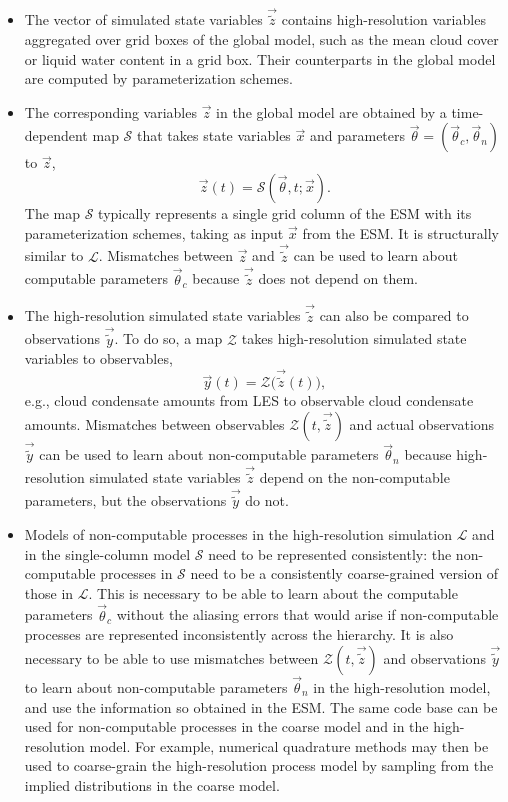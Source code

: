 \documentclass{article}
\begin{document}
\begin{itemize}
    \item The vector of simulated state variables $\vec{\tilde z}$ contains high-resolution variables aggregated over grid boxes of the global model,  such as the mean cloud cover or liquid water content in a grid box. Their counterparts in the global model are computed by parameterization schemes.
    \item The corresponding variables $\vec{z}$ in the global model are obtained by a time-depen\-dent map $\mathcal{S}$ that takes state variables $\vec{x}$ and parameters $\vec{\theta} = (\vec{\theta}_c, \vec{\theta}_n)$ to $\vec{z}$,
    \begin{equation}
    \vec{z}(t) = \mathcal{S}(\vec{\theta},t; \vec{x}).
    \end{equation}
    The map $\mathcal{S}$ typically represents a single grid column of the ESM with its parameterization schemes, taking as input $\vec{x}$ from the ESM. It is structurally similar to $\mathcal{L}$. Mismatches between $\vec{z}$ and $\vec{\tilde z}$ can be used to learn about computable parameters $\vec{\theta}_c$ because $\vec{\tilde z}$ does not depend on them.
    \item The high-resolution simulated state variables $\vec{\tilde z}$ can also be compared to observations $\vec{\tilde y}$. To do so, a map $\mathcal{Z}$ takes high-resolution simulated state variables to observables,
    \begin{equation}
        \vec{y}(t) = \mathcal{Z}\bigl(\vec{\tilde z}(t)\bigr),
    \end{equation}
    e.g., cloud condensate amounts from LES to observable cloud condensate amounts. Mismatches between observables $\mathcal{Z}(t, \vec{\tilde z})$ and actual observations $\vec{\tilde y}$ can be used to learn about non-computable parameters $\vec{\theta}_n$ because high-resolution simulated state variables $\vec{\tilde z}$ depend on the non-computable parameters, but the observations $\vec{\tilde y}$ do not. 
    \item  Models of non-computable processes in the high-resolution simulation $\mathcal{L}$ and in the single-column model $\mathcal{S}$ need to be represented consistently: the non-computable processes in $\mathcal{S}$ need to be a consistently coarse-grained version of those in $\mathcal{L}$. This is necessary to be able to learn about the computable parameters $\vec{\theta}_c$ without the aliasing errors that would arise if non-computable processes are represented inconsistently across the hierarchy. It is also necessary to be able to use mismatches between $\mathcal{Z}(t, \vec{\tilde z})$ and observations $\vec{\tilde y}$ to learn about non-computable parameters $\vec{\theta}_n$ in the high-resolution model, and use the information so obtained in the ESM. The same code base can be used for non-computable processes in the coarse model and in the high-resolution model. For example, numerical quadrature methods may then be used to coarse-grain the high-resolution process model by sampling from the implied distributions in the coarse model.
\end{itemize}
\end{document}

